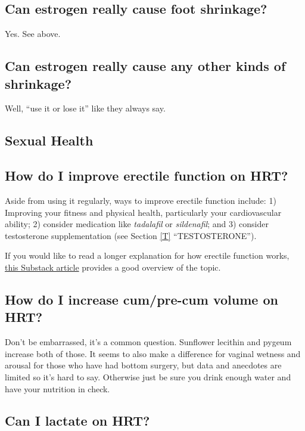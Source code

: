 \documentclass{article}
\begin{document}
\subsection{Can estrogen really cause foot shrinkage?}

Yes. See above.

\subsection{Can estrogen really cause any other kinds of shrinkage?}

Well, “use it or lose it” like they always say.

\subsection*{Sexual Health}

\subsection{How do I improve erectile function on HRT?}\label{11-20}

Aside from using it regularly, ways to improve erectile function include: 1) Improving your fitness and physical health, particularly your cardiovascular ability; 2) consider medication like \textit{tadalafil} or \textit{sildenafil}; and 3) consider testosterone supplementation (see Section \ref{T} “TESTOSTERONE”).

If you would like to read a longer explanation for how erectile function works, \href{https://stainedglasswoman.substack.com/p/how-to-maintain-your-penis-function}{this Substack article} provides a good overview of the topic.

\subsection{How do I increase cum/pre-cum volume on HRT?}

Don’t be embarrassed, it’s a common question. Sunflower lecithin and pygeum increase both of those. It seems to also make a difference for vaginal wetness and arousal for those who have had bottom surgery, but data and anecdotes are limited so it’s hard to say. Otherwise just be sure you drink enough water and have your nutrition in check.

\subsection{Can I lactate on HRT?}
\end{document}
